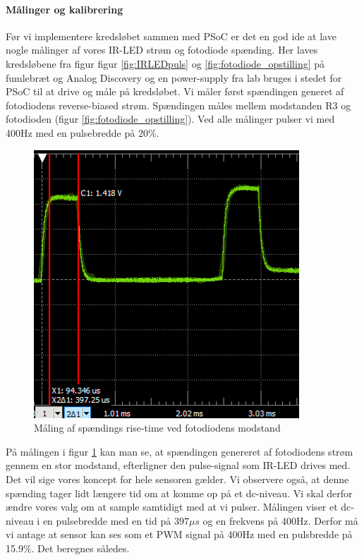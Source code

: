 \documentclass[Rapport/Rapport_main.tex]{subfiles}
\begin{document}
\paragraph{Målinger og kalibrering}
\newline
\newline
Før vi implementere kredsløbet sammen med PSoC er det en god ide at lave nogle målinger af vores IR-LED strøm og fotodiode spænding. Her laves kredsløbene fra figur figur \ref{fig:IRLEDpuls} og \ref{fig:fotodiode_opstilling} på fumlebræt og Analog Discovery og en power-supply fra lab bruges i stedet for PSoC til at drive og måle på kredsløbet. Vi måler først spændingen generet af fotodiodens reverse-biased strøm. Spændingen måles mellem modstanden R3 og fotodioden (figur \ref{fig:fotodiode_opstilling}). Ved alle målinger pulser vi med 400Hz med en pulsebredde på 20\%.
\begin{figure}[H]
    \centering
    \includegraphics{Rapport/BallDispenser/BallCountSensor/graphics/Maling1.png}
    \caption{Måling af spændings rise-time ved fotodiodens modstand}
    \label{fig:Måling1_AD}
\end{figure}
På målingen i figur \ref{fig:Måling1_AD} kan man se, at spændingen genereret af fotodiodens strøm gennem en stor modstand, efterligner den pulse-signal som IR-LED drives med. Det vil sige vores koncept for hele sensoren gælder. Vi observere også, at denne spænding tager lidt længere tid om at komme op på et dc-niveau. Vi skal derfor ændre vores valg om at sample samtidigt med at vi pulser. Målingen viser et dc-niveau i en pulsebredde med en tid på $397\mu s$ og en frekvens på 400Hz. Derfor må vi antage at sensor kan ses som et PWM signal på 400Hz med en pulsbredde på 15.9\%. Det beregnes således.
\end{document}
